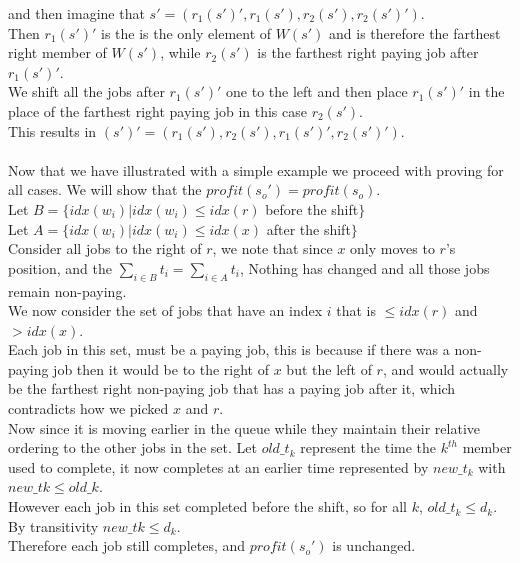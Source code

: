 \documentclass{article}
\begin{document}
          and then imagine that $s' = (r_{1}(s')', r_{1}(s'), r_{2}(s'),r_{2}(s')')$.\\
          Then $r_{1}(s')'$ is the is the only element of $W(s')$ and is therefore the farthest right member of $W(s')$, while $r_{2}(s')$ is the farthest right paying job after $r_{1}(s')'$. \\
          We shift all the jobs after $r_{1}(s')'$ one to the left and then place $r_{1}(s')'$ in the place of the farthest right paying job in this case $r_{2}(s')$. \\
          This results in $(s')' = (r_{1}(s'), r_{2}(s'),r_{1}(s')',r_{2}(s')')$.\\
          \\
          Now that we have illustrated with a simple example we proceed with proving for all cases.
          We will show that the $profit(s_{o}') = profit(s_{o})$. \\
          Let $B = \{idx(w_{i}) | idx(w_{i}) \leq idx(r)$ before the shift$\}$ \\
          Let $A = \{idx(w_{i}) | idx(w_{i}) \leq idx(x)$ after the shift$\}$ \\
          Consider all jobs to the right of $r$, we note that since $x$ only moves to $r$'s position, and the $\sum_{i \in B} t_{i} = \sum_{i \in A} t_{i}$, Nothing has changed and all those jobs remain non-paying. \\
          We now consider the set of jobs that have an index $i$ that is $\leq idx(r)$ and $> idx(x)$. \\
          Each job in this set, must be a paying job, this is because if there was a non-paying job then it would be to the right of $x$ but the left of $r$, and would actually be the farthest right non-paying job that has a paying job after it, which contradicts how we picked $x$ and $r$. \\
          Now since it is moving earlier in the queue while they maintain their relative ordering to the other jobs in the set. Let $old\_t_{k}$ represent the time the $k^{th}$ member used to complete, it now completes at an earlier time represented by $new\_t_{k}$ with $new\_t{k} \leq old\_{k}$. \\
          However each job in this set completed before the shift, so for all $k$, $old\_t_{k} \leq d_{k}$. \\
          By transitivity $new\_t{k} \leq d_{k}$. \\
          Therefore each job still completes, and $profit(s_{o}')$ is unchanged. \\
\end{document}
